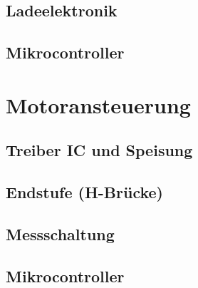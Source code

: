 \subsection*{Ladeelektronik}
\subsection*{Mikrocontroller}


\section{Motoransteuerung}
\label{HW_Motoransteuerung}
\subsection*{Treiber IC und Speisung}
\subsection*{Endstufe (H-Brücke)}
\subsection*{Messschaltung}
\subsection*{Mikrocontroller}


